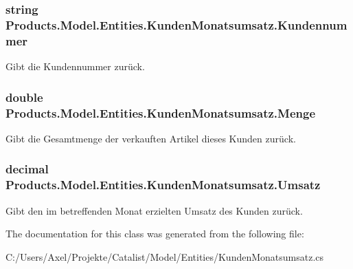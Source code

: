 \subsubsection[{\texorpdfstring{Kundennummer}{Kundennummer}}]{\setlength{\rightskip}{0pt plus 5cm}string Products.\+Model.\+Entities.\+Kunden\+Monatsumsatz.\+Kundennummer\hspace{0.3cm}{\ttfamily [get]}}\hypertarget{class_products_1_1_model_1_1_entities_1_1_kunden_monatsumsatz_a709e181ba68b46c6323c8773b4fbdecf}{}\label{class_products_1_1_model_1_1_entities_1_1_kunden_monatsumsatz_a709e181ba68b46c6323c8773b4fbdecf}


Gibt die Kundennummer zurück. 

\subsubsection[{\texorpdfstring{Menge}{Menge}}]{\setlength{\rightskip}{0pt plus 5cm}double Products.\+Model.\+Entities.\+Kunden\+Monatsumsatz.\+Menge\hspace{0.3cm}{\ttfamily [get]}}\hypertarget{class_products_1_1_model_1_1_entities_1_1_kunden_monatsumsatz_aa2c96197f3801f13530d68317b86022e}{}\label{class_products_1_1_model_1_1_entities_1_1_kunden_monatsumsatz_aa2c96197f3801f13530d68317b86022e}


Gibt die Gesamtmenge der verkauften Artikel dieses Kunden zurück. 

\subsubsection[{\texorpdfstring{Umsatz}{Umsatz}}]{\setlength{\rightskip}{0pt plus 5cm}decimal Products.\+Model.\+Entities.\+Kunden\+Monatsumsatz.\+Umsatz\hspace{0.3cm}{\ttfamily [get]}}\hypertarget{class_products_1_1_model_1_1_entities_1_1_kunden_monatsumsatz_aebeefe2e43b71caad1c8192b3c32b754}{}\label{class_products_1_1_model_1_1_entities_1_1_kunden_monatsumsatz_aebeefe2e43b71caad1c8192b3c32b754}


Gibt den im betreffenden Monat erzielten Umsatz des Kunden zurück. 



The documentation for this class was generated from the following file\+:\begin{DoxyCompactItemize}
\item 
C\+:/\+Users/\+Axel/\+Projekte/\+Catalist/\+Model/\+Entities/Kunden\+Monatsumsatz.\+cs\end{DoxyCompactItemize}
